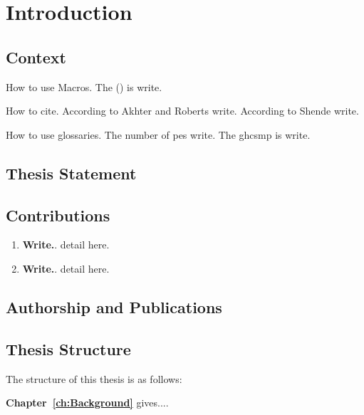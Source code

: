                              
\chapter{Introduction}
\label{ch:introduction}


\section{Context}



How to use Macros. The \ghcf{} (\ghc) is write.

How to cite. According to Akhter and Roberts \cite{Akhter06} write.
According to Shende \etal\cite{Shende98-TAU} write.


How to use glossaries. The number of \glspl{pe} write.
The \gls{ghcsmp} is write.




\section{Thesis Statement}



\section{Contributions}



\begin{enumerate}


\item 
\textbf{Write.}.  
detail here.


\item 
\textbf{Write.}.  
detail here.

\end{enumerate}




\section{Authorship and Publications}








\section{Thesis Structure}

The structure of this thesis is as follows:

\textbf{Chapter~\ref{ch:Background}} \space gives....



